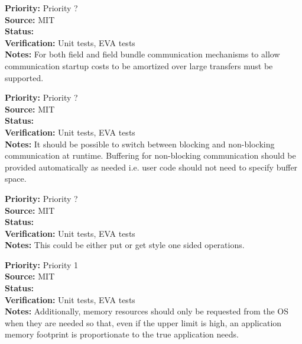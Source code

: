 \begin{reqlist}
{\bf Priority:} Priority ? \\
{\bf Source:}  MIT \\
{\bf Status:}  \\
{\bf Verification:} Unit tests, EVA tests \\
{\bf Notes:}
For both field and field bundle communication mechanisms to allow communication
startup costs to be amortized over large transfers must be supported.
\end{reqlist}

\begin{reqlist}
{\bf Priority:} Priority ? \\
{\bf Source:}  MIT \\
{\bf Status:}  \\
{\bf Verification:} Unit tests, EVA tests \\
{\bf Notes:}
It should be possible to switch between blocking and non-blocking
communication at runtime. Buffering for non-blocking communication should
be provided automatically as needed i.e. user code should not need to
specify buffer space.
\end{reqlist}

\begin{reqlist}
{\bf Priority:} Priority ? \\
{\bf Source:}  MIT \\
{\bf Status:}  \\
{\bf Verification:} Unit tests, EVA tests \\
{\bf Notes:}
This could be either put or get style one sided operations.
\end{reqlist}



\begin{reqlist}
{\bf Priority:} Priority 1 \\
{\bf Source:}  MIT \\
{\bf Status:}  \\
{\bf Verification:} Unit tests, EVA tests \\
{\bf Notes:}
Additionally, memory resources should only be requested from the OS when they are needed so that,
even if the upper limit is high, an application memory footprint is proportionate
to the true application needs.
\end{reqlist}

